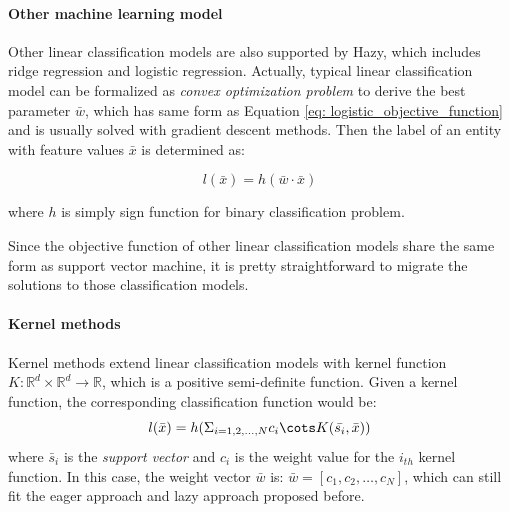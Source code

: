 \paragraph{Other machine learning model}
Other linear classification models are also supported by Hazy, which includes ridge regression and logistic regression. Actually, typical linear classification model can be formalized as {\em convex optimization problem} to derive the best parameter $\bar{w}$, which has same form as Equation \ref{eq: logistic_objective_function} and is usually solved with gradient descent methods. Then the label of an entity with feature values $\bar{x}$ is determined as:

\begin{equation}
    l(\bar{x}) = h(\bar{w}\cdot\bar{x})
\end{equation}


where $h$ is simply sign function for binary classification problem.

Since the objective function of other linear classification models share the same form as support vector machine, it is pretty straightforward to migrate the solutions to those classification models.

\paragraph{Kernel methods}
Kernel methods extend linear classification models with kernel function $K: \mathbb{R}^d \times \mathbb{R}^d \rightarrow \mathbb{R}$, which is a positive semi-definite function. Given a kernel function, the corresponding classification function would be:
\begin{equation}\label{eq: kernel classification}
    l(\bar{x})=h(\Sigma_{i=1,2,\dots,N}c_i\cots K(\bar{s_i}, \bar{x}))
\end{equation}
where $\bar{s}_i$ is the {\em support vector} and $c_i$ is the weight value for the $i_{th}$ kernel function. In this case, the weight vector $\bar{w}$ is: $\bar{w} = [c_1, c_2,\dots, c_N]$, which can still fit the eager approach and lazy approach proposed before.

